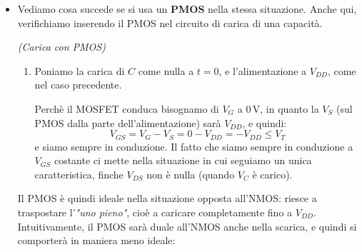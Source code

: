 \documentclass[a4paper,11pt]{article}
\begin{document}
\begin{itemize}
\par\smallskip
\textit{(Scarica con NMOS)}
\begin{enumerate}
	\item 
Possiamo confermare questa asimmetria vedendo situazione duale, dove la $V_C = V_{DD}$ (la capacità è gia carica) e vogliamo usare il MOSFET per scaricarla a ground. 
In questo caso, posta sempre $V_G = V_{DD}$, si ha:
$$
V_{GS} = V_G - V_S = V_{DD} - 0 \geq V_T 
$$
in quanto $V_S$ è sempre nulla (stiamo conducendo la scarica del condensatore verso ground), e il MOSFET è sempre in conduzione.

Per quanto riguarda la saturazione, abbiamo che la $V_{DS}$ è:
$$
V_{DS} = V_D - V_S = V_C > V_T
$$
e quindi siamo in saturazione per $V_C > V_T$, regime ohmico altrimenti.

Riassumiamo quanto detto: siamo sempre in conduzione, e la $V_{GS}$ non cambia in quanto la $V_S$ è fissa a 0. Questo significherà che seguiamo sempre la stessa caratteristica fino a $V_{DS} = 0 \, \mathrm{V}$, cioè fino alla scarica completa della capacità. 

\end{enumerate}

\item Vediamo cosa succede se si usa un \textbf{PMOS} nella stessa situazione. Anche qui, verifichiamo inserendo il PMOS nel circuito di carica di una capacità.

\par\smallskip
\textit{(Carica con PMOS)}
\begin{enumerate}
	\item
Poniamo la carica di $C$ come nulla a $t = 0$, e l'alimentazione a $V_{DD}$, come nel caso precedente.

Perchè il MOSFET conduca bisognamo di $V_G$ a $0 \, \mathrm{V}$, in quanto la $V_S$ (sul PMOS dalla parte dell'alimentazione) sarà $V_{DD}$, e quindi:
$$
V_{GS} = V_G - V_S = 0 - V_{DD} = -V_{DD} \leq V_T
$$
e siamo sempre in conduzione. Il fatto che siamo sempre in conduzione a $V_{GS}$ costante ci mette nella situazione in cui seguiamo un unica caratteristica, finche $V_{DS}$ non è nulla (quando $V_C$ è carico). 
\end{enumerate}

Il PMOS è quindi ideale nella situazione opposta all'NMOS: riesce a traspostare l'\textit{"uno pieno"}, cioè a caricare completamente fino a $V_{DD}$. Intuitivamente, il PMOS sarà duale all'NMOS anche nella scarica, e quindi si comporterà in maniera meno ideale:


\end{itemize}
\end{document}

